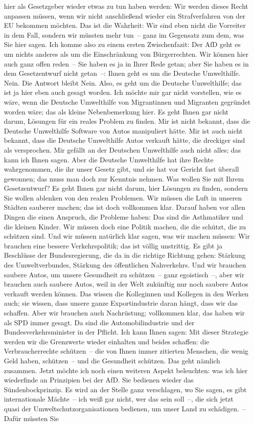 \documentclass{article}
\begin{document}
hier als Gesetzgeber wieder etwas zu tun haben werden: Wir werden dieses Recht anpassen müssen, wenn wir nicht anschließend wieder ein Strafverfahren von der EU bekommen möchten. Das ist die Wahrheit: Wir sind eben nicht die Vorreiter in dem Fall, sondern wir müssten mehr tun – ganz im Gegensatz zum dem, was Sie hier sagen.  Ich komme also zu einem ersten Zwischenfazit: Der AfD geht es um nichts anderes als um die Einschränkung von Bürgerrechten.  Wir können hier auch ganz offen reden – Sie haben es ja in Ihrer Rede getan; aber Sie haben es in dem Gesetzentwurf nicht getan –: Ihnen geht es um die Deutsche Umwelthilfe. Nein. Die Antwort bleibt Nein.  Also, es geht um die Deutsche Umwelthilfe; das ist ja hier eben auch gesagt worden. Ich möchte mir gar nicht vorstellen, wie es wäre, wenn die Deutsche Umwelthilfe von Migrantinnen und Migranten gegründet worden wäre; das als kleine Nebenbemerkung hier.  Es geht Ihnen gar nicht darum, Lösungen für ein reales Problem zu finden. Mir ist nicht bekannt, dass die Deutsche Umwelthilfe Software von Autos manipuliert hätte. Mir ist auch nicht bekannt, dass die Deutsche Umwelthilfe Autos verkauft hätte, die dreckiger sind als versprochen.  Mir gefällt an der Deutschen Umwelthilfe auch nicht alles; das kann ich Ihnen sagen. Aber die Deutsche Umwelthilfe hat ihre Rechte wahrgenommen, die ihr unser Gesetz gibt, und sie hat vor Gericht fast überall gewonnen; das muss man doch zur Kenntnis nehmen. Was wollen Sie mit Ihrem Gesetzentwurf? Es geht Ihnen gar nicht darum, hier Lösungen zu finden, sondern Sie wollen ablenken von den realen Problemen. Wir müssen die Luft in unseren Städten sauberer machen; das ist doch vollkommen klar. Darauf haben vor allen Dingen die einen Anspruch, die Probleme haben: Das sind die Asthmatiker und die kleinen Kinder. Wir müssen doch eine Politik machen, die die schützt, die zu schützen sind.  Und wir müssen natürlich klar sagen, was wir machen müssen: Wir brauchen eine bessere Verkehrspolitik; das ist völlig unstrittig. Es gibt ja Beschlüsse der Bundesregierung, die da in die richtige Richtung gehen: Stärkung des Umweltverbundes, Stärkung des öffentlichen Nahverkehrs.  Und wir brauchen saubere Autos, um unsere Gesundheit zu schützen – ganz egoistisch –, aber wir brauchen auch saubere Autos, weil in der Welt zukünftig nur noch saubere Autos verkauft werden können.  Das wissen die Kolleginnen und Kollegen in den Werken auch; sie wissen, dass unsere ganze Exportindustrie daran hängt, dass wir das schaffen. Aber wir brauchen auch Nachrüstung; vollkommen klar, das haben wir als SPD immer gesagt. Da sind die Automobilindustrie und der Bundesverkehrsminister in der Pflicht. Ich kann Ihnen sagen: Mit dieser Strategie werden wir die Grenzwerte wieder einhalten und beides schaffen: die Verbraucherrechte schützen – die von Ihnen immer zitierten Menschen, die wenig Geld haben, schützen – und die Gesundheit schützen. Das geht nämlich zusammen.  Jetzt möchte ich noch einen weiteren Aspekt beleuchten: was ich hier wiederfinde an Prinzipien bei der AfD. Sie bedienen wieder das Sündenbockprinzip. Es wird an der Stelle ganz verschlagen, wo Sie sagen, es gibt internationale Mächte – ich weiß gar nicht, wer das sein soll –,  die sich jetzt quasi der Umweltschutzorganisationen bedienen, um unser Land zu schädigen. – Dafür müssten Sie 
\end{document}
